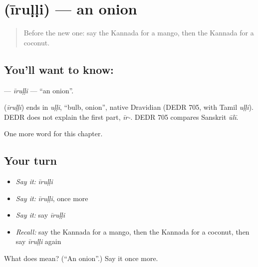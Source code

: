 \section[\texorpdfstring{\kn{ಈರುಳ್ಳಿ} (īruḷḷi)}{ಈರುಳ್ಳಿ (īruḷḷi)}]{ (īruḷḷi) — an onion}

\label{lesson:KA-C123-irulli}



\begin{quote}
Before the new one: say the Kannada for a mango, then the Kannada for a coconut.
\end{quote}

\subsection*{You'll want to know: }
\textbf{} — \emph{īruḷḷi} — \textquotedblleft{}an onion\textquotedblright{}.

\begin{cousinweb}
\textbf{} (\emph{īruḷḷi}) ends in \emph{uḷḷi}, \textquotedblleft{}bulb, onion\textquotedblright{}, native Dravidian (DEDR 705, with Tamil \emph{uḷḷi}). DEDR does not explain the first part, \emph{īr-}. DEDR 705 compares Sanskrit \emph{ūlī}.
\end{cousinweb}

\begin{grammarlens}[title={What you've built}]
One more word for this chapter.
\end{grammarlens}

\subsection*{Your turn}
\begin{itemize}
\raggedright
  \item \emph{Say it:} \emph{īruḷḷi}
  \item \emph{Say it:} \emph{īruḷḷi}, once more
  \item \emph{Say it:} say \emph{īruḷḷi}
  \item \emph{Recall:} say the Kannada for a mango, then the Kannada for a coconut, then say \emph{īruḷḷi} again
\end{itemize}

\begin{tcolorbox}[breakable,colback=teal!4,colframe=teal!35!black,title={Before you move on}]
What does  mean? (\textquotedblleft{}An onion\textquotedblright{}.) Say it once more.
\end{tcolorbox}
